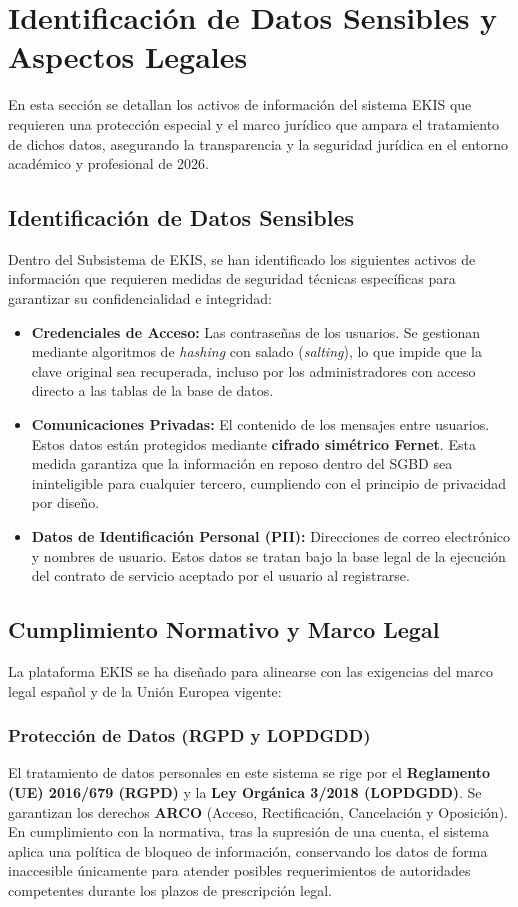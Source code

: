 \chapter{Identificación de Datos Sensibles y Aspectos Legales}

En esta sección se detallan los activos de información del sistema EKIS que requieren una protección especial y el marco jurídico que ampara el tratamiento de dichos datos, asegurando la transparencia y la seguridad jurídica en el entorno académico y profesional de 2026.

\section{Identificación de Datos Sensibles}
Dentro del Subsistema de EKIS, se han identificado los siguientes activos de información que requieren medidas de seguridad técnicas específicas para garantizar su confidencialidad e integridad:

\begin{itemize}
    \item \textbf{Credenciales de Acceso:} Las contraseñas de los usuarios. Se gestionan mediante algoritmos de \textit{hashing} con salado (\textit{salting}), lo que impide que la clave original sea recuperada, incluso por los administradores con acceso directo a las tablas de la base de datos.
    \item \textbf{Comunicaciones Privadas:} El contenido de los mensajes entre usuarios. Estos datos están protegidos mediante \textbf{cifrado simétrico Fernet}. Esta medida garantiza que la información en reposo dentro del SGBD sea ininteligible para cualquier tercero, cumpliendo con el principio de privacidad por diseño.
    \item \textbf{Datos de Identificación Personal (PII):} Direcciones de correo electrónico y nombres de usuario. Estos datos se tratan bajo la base legal de la ejecución del contrato de servicio aceptado por el usuario al registrarse.
\end{itemize}

\section{Cumplimiento Normativo y Marco Legal}
La plataforma EKIS se ha diseñado para alinearse con las exigencias del marco legal español y de la Unión Europea vigente:

\subsection{Protección de Datos (RGPD y LOPDGDD)}
El tratamiento de datos personales en este sistema se rige por el \textbf{Reglamento (UE) 2016/679 (RGPD)} y la \textbf{Ley Orgánica 3/2018 (LOPDGDD)}. Se garantizan los derechos \textbf{ARCO} (Acceso, Rectificación, Cancelación y Oposición). En cumplimiento con la normativa, tras la supresión de una cuenta, el sistema aplica una política de bloqueo de información, conservando los datos de forma inaccesible únicamente para atender posibles requerimientos de autoridades competentes durante los plazos de prescripción legal.


